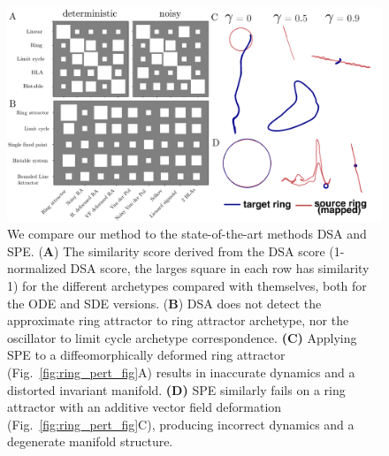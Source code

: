 \documentclass{article}
\theoremstyle{definition} \newtheorem{definition}{Definition}  \newtheorem{example}{Example}
\theoremstyle{remark} \newtheorem{remark}{Remark}
\newcounter{ct}
\begin{document}
\begin{figure}[tbhp]
    \centering
    \includegraphics[width=0.9\linewidth]{dsa_spe}
    \caption{We compare our method to the state-of-the-art methods DSA\citep{ostrow2024beyond} and SPE\citep{friedman2025characterizing}.
      (\textbf{A}) The similarity score derived from the DSA score (1-normalized DSA score, the larges square in each row has similarity 1) for the different archetypes compared with themselves, both for the ODE and SDE versions.
        (\textbf{B}) DSA does not detect the approximate ring attractor to ring attractor archetype, nor the oscillator to limit cycle archetype correspondence.
\textbf{(C)} Applying SPE to a diffeomorphically deformed ring attractor (Fig.~\ref{fig:ring_pert_fig}A) results in inaccurate dynamics and a distorted invariant manifold.  
\textbf{(D)} SPE similarly fails on a ring attractor with an additive vector field deformation (Fig.~\ref{fig:ring_pert_fig}C), producing incorrect dynamics and a degenerate manifold structure.
    }
    \label{fig:dsa_spe}
\end{figure}


\end{document}
